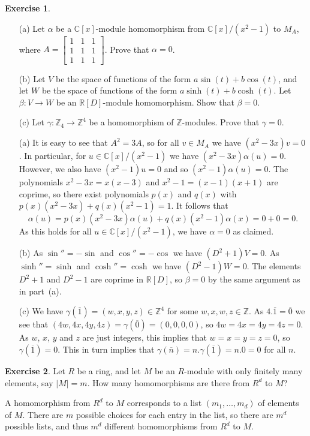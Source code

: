 \documentclass{amsart}
\newcommand{\bsm}       {\left[\begin{smallmatrix}}
\newcommand{\esm}       {\end{smallmatrix}\right]}
\newcommand{\C}         {{\mathbb{C}}}
\newcommand{\R}         {{\mathbb{R}}}
\newcommand{\Z}         {{\mathbb{Z}}}
\newcommand{\al}        {\alpha}
\newcommand{\bt}        {\beta}
\newcommand{\gm}        {\gamma}
\newcommand{\ov}[1]     {\overline{#1}}
\newcommand{\xra}       {\xrightarrow}
\newcommand{\ip}[1]     {\langle #1\rangle}
\renewcommand{\:}{\colon}
\theoremstyle{definition}
\newtheorem{exercise}{Exercise}[section]
\renewenvironment{solution}{\SolutionAtEnd}{\endSolutionAtEnd}
\begin{document}
\begin{exercise}
 \begin{itemize}
  \item[(a)] Let $\al$ be a $\C[x]$-module homomorphism from
   $\C[x]/(x^2-1)$ to $M_A$, where $A=\bsm 1&1&1\\1&1&1\\1&1&1\esm$.
   Prove that $\al=0$.
  \item[(b)] Let $V$ be the space of functions of the form
   $a\sin(t)+b\cos(t)$, and let $W$ be the space of functions of the
   form $a\sinh(t)+b\cosh(t)$.  Let $\bt\:V\xra{}W$ be an
   $\R[D]$-module homomorphism.  Show that $\bt=0$.
  \item[(c)] Let $\gm\:\Z_4\xra{}\Z^4$ be a homomorphism of
   $\Z$-modules.  Prove that $\gm=0$.
 \end{itemize}
\end{exercise}
\begin{solution}
 \begin{itemize}
  \item[(a)] It is easy to see that $A^2=3A$, so for all $v\in M_A$ we
   have $(x^2-3x)v=0$.  In particular, for $u\in\C[x]/(x^2-1)$ we have
   $(x^2-3x)\al(u)=0$.  However, we also have $(x^2-1)u=0$ and so
   $(x^2-1)\al(u)=0$.  The polynomials $x^2-3x=x(x-3)$ and
   $x^2-1=(x-1)(x+1)$ are coprime, so there exist polynomials $p(x)$
   and $q(x)$ with $p(x)(x^2-3x)+q(x)(x^2-1)=1$.  It follows that
   \[ \al(u)=p(x)(x^2-3x)\al(u) + q(x)(x^2-1)\al(x)=0+0=0. \]
   As this holds for all $u\in\C[x]/(x^2-1)$, we have $\al=0$ as
   claimed.
  \item[(b)] As $\sin''=-\sin$ and $\cos''=-\cos$ we have
   $(D^2+1)V=0$.  As $\sinh''=\sinh$ and $\cosh''=\cosh$ we have
   $(D^2-1)W=0$.  The elements $D^2+1$ and $D^2-1$ are coprime in
   $\R[D]$, so $\bt=0$ by the same argument as in part~(a).  
  \item[(c)] We have $\gm(\ov{1})=(w,x,y,z)\in\Z^4$ for some
   $w,x,w,z\in\Z$.  As $4.\ov{1}=\ov{0}$ we see that
   $(4w,4x,4y,4z)=\gm(\ov{0})=(0,0,0,0)$, so $4w=4x=4y=4z=0$.  As $w$,
   $x$, $y$ and $z$ are just integers, this implies that $w=x=y=z=0$,
   so $\gm(\ov{1})=0$.  This in turn implies that
   $\gm(\ov{n})=n.\gm(\ov{1})=n.0=0$ for all $n$.
 \end{itemize} 
\end{solution}

\begin{exercise}
 Let $R$ be a ring, and let $M$ be an $R$-module with only finitely
 many elements, say $|M|=m$.  How many homomorphisms are there from
 $R^d$ to $M$?
\end{exercise}
\begin{solution}
 A homomorphism from $R^d$ to $M$ corresponds to a list
 $(m_1,\ldots,m_d)$ of elements of $M$.  There are $m$ possible
 choices for each entry in the list, so there are $m^d$ possible
 lists, and thus $m^d$ different homomorphisms from $R^d$ to $M$.
\end{solution}
\end{document}
